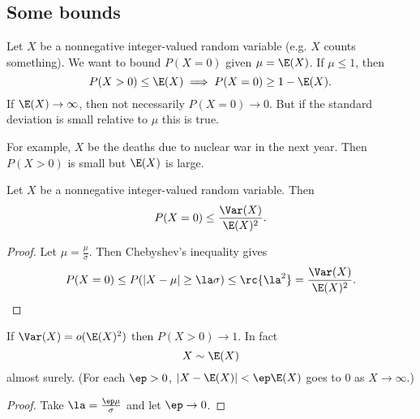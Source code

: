 \subsection{Some bounds}
Let $X$ be a nonnegative integer-valued random variable (e.g. $X$ counts something). We want to bound $P(X=0)$ given $\mu=\E(X)$. If $\mu\leq 1$, then
\[P(X>0)\leq \E(X)\implies P(X=0)\geq 1-\E(X).\]
If $\E(X)\to \infty$, then not necessarily $P(X=0)\to 0$. But if the standard deviation is small relative to $\mu$ this is true. 

\begin{ex}
For example, $X$ be the deaths due to nuclear war in the next year. 
Then $P(X>0)$ is small but $\E(X)$ is large.
\end{ex}

\begin{thm}
Let $X$ be a nonnegative integer-valued random variable. Then
\[P(X=0)\leq \frac{\Var(X)}{\E(X)^2}.\]
\end{thm}
\begin{proof}
Let $\mu=\frac{\mu}{\sigma}$. Then Chebyshev's inequality gives
\[
P(X=0)\leq P(|X-\mu|\geq \la\sigma)\leq \rc{\la^2}=\frac{\Var(X)}{\E(X)^2}.
\]
\end{proof}
\begin{cor}
If $\Var(X)=o(\E(X)^2)$ then %
$P(X>0)\to 1$. In fact
\[
X\sim \E(X)
\]
almost surely. (For each $\ep>0$, $|X-\E(X)|<\ep\E(X)$ goes to 0 as $X\to \infty$.)
\end{cor}
\begin{proof}
Take $\la=\frac{\ep\mu}{\sigma}$ and let $\ep\to 0$.
\end{proof}